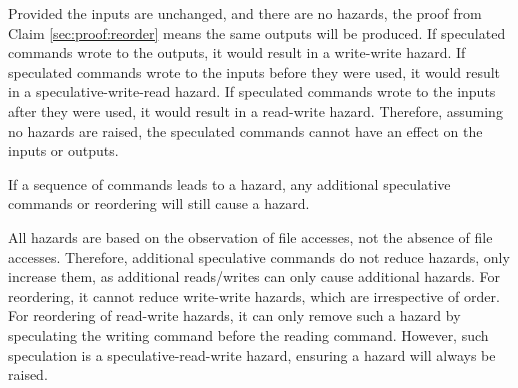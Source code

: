 \proof Provided the inputs are unchanged, and there are no hazards, the proof from Claim \ref{sec:proof:reorder} means the same outputs will be produced. If speculated commands wrote to the outputs, it would result in a write-write hazard. If speculated commands wrote to the inputs before they were used, it would result in a speculative-write-read hazard. If speculated commands wrote to the inputs after they were used, it would result in a read-write hazard. Therefore, assuming no hazards are raised, the speculated commands cannot have an effect on the inputs or outputs.

\begin{claim}
\label{sec:proof:keep_hazards}

 If a sequence of commands leads to a hazard, any additional speculative commands or reordering will still cause a hazard.
\end{claim}

\proof All hazards are based on the observation of file accesses, not the absence of file accesses. Therefore, additional speculative commands do not reduce hazards, only increase them, as additional reads/writes can only cause additional hazards. For reordering, it cannot reduce write-write hazards, which are irrespective of order. For reordering of read-write hazards, it can only remove such a hazard by speculating the writing command before the reading command. However, such speculation is a speculative-read-write hazard, ensuring a hazard will always be raised.

